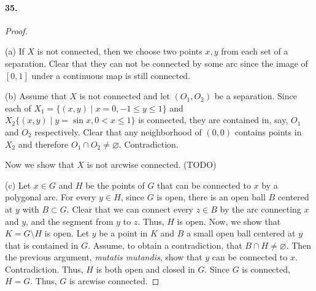 \paragraph{35.}
\begin{proof}
  $\,$\par
  (a) If $X$ is not connected, then we choose two points $x, y$ from each set
  of a separation. Clear that they can not be connected by some arc since the
  image of $[0, 1]$ under a continuous map is still connected.
  
  (b) Assume that $X$ is not connected and let $(O_1, O_2)$ be a separation.
  Since each of $X_1=\{(x, y) \mid x = 0, -1\le y \le 1\}$ and $X_2\{(x, y)
  \mid y = \sin x, 0 < x \le 1\}$ is connected, they are contained in, say,
  $O_1$ and $O_2$ respectively. Clear that any neighborhood of $(0, 0)$
  contains points in $X_2$ and therefore $O_1\cap O_2 \ne \varnothing$. 
  Contradiction. 
  
  Now we show that $X$ is not arcwise connected. (TODO)
  
  (c) Let $x \in G$ and $H$ be the points of $G$ that can be connected to $x$
  by a polygonal arc. For every $y \in H$, since $G$ is open, there is an open
  ball $B$ centered at $y$ with $B \subset G$. Clear that we can connect every
  $z \in B$ by the arc connecting $x$ and $y$, and the segment from $y$ to $z$.
  Thus, $H$ is open. Now, we show that $K = G\setminus H$ is open. Let $y$ be
  a point in $K$ and $B$ a small open ball centered at $y$ that is contained in
  $G$. Assume, to obtain a contradiction, that $B \cap H \ne \varnothing$. Then
  the previous argument, \textit{mutatis mutandis}, show that $y$ can be
  connected to $x$. Contradiction. Thus, $H$ is both open and closed in $G$.
  Since $G$ is connected, $H = G$. Thus, $G$ is arcwise connected. 
\end{proof}
















